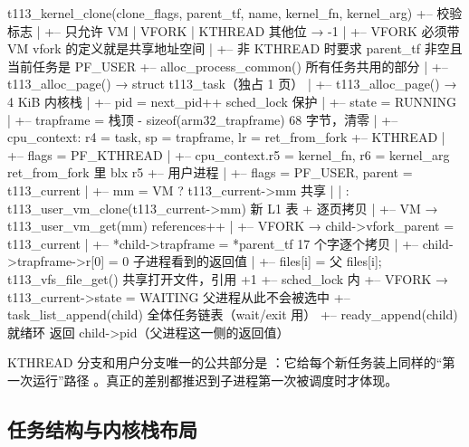 \begin{txtcode}
t113_kernel_clone(clone_flags, parent_tf, name, kernel_fn, kernel_arg)
+-- 校验标志
|   +-- 只允许 VM | VFORK | KTHREAD                     其他位 → -1
|   +-- VFORK 必须带 VM                                   vfork 的定义就是共享地址空间
|   +-- 非 KTHREAD 时要求 parent_tf 非空且当前任务是 PF_USER
+-- alloc_process_common()                              所有任务共用的部分
|   +-- t113_alloc_page()  → struct t113_task（独占 1 页）
|   +-- t113_alloc_page()  → 4 KiB 内核栈
|   +-- pid = next_pid++                                 sched_lock 保护
|   +-- state = RUNNING
|   +-- trapframe = 栈顶 - sizeof(arm32_trapframe)       68 字节，清零
|   +-- cpu_context: r4 = task, sp = trapframe, lr = ret_from_fork
+-- KTHREAD
|   +-- flags = PF_KTHREAD
|   +-- cpu_context.r5 = kernel_fn, r6 = kernel_arg      ret_from_fork 里 blx r5
+-- 用户进程
|   +-- flags = PF_USER, parent = t113_current
|   +-- mm = VM ? t113_current->mm                       共享
|   |          : t113_user_vm_clone(t113_current->mm)   新 L1 表 + 逐页拷贝
|   +-- VM    → t113_user_vm_get(mm)                    references++
|   +-- VFORK → child->vfork_parent = t113_current
|   +-- *child->trapframe = *parent_tf                   17 个字逐个拷贝
|   +-- child->trapframe->r[0] = 0                       子进程看到的返回值
|   +-- files[i] = 父 files[i]; t113_vfs_file_get()      共享打开文件，引用 +1
+-- sched_lock 内
    +-- VFORK → t113_current->state = WAITING            父进程从此不会被选中
    +-- task_list_append(child)                          全体任务链表（wait/exit 用）
    +-- ready_append(child)                              就绪环
返回 child->pid（父进程这一侧的返回值）
\end{txtcode}

KTHREAD 分支和用户分支唯一的公共部分是 ：它给每个新任务装上同样的“第一次运行”路径 。真正的差别都推迟到子进程第一次被调度时才体现。

\subsection{任务结构与内核栈布局}

